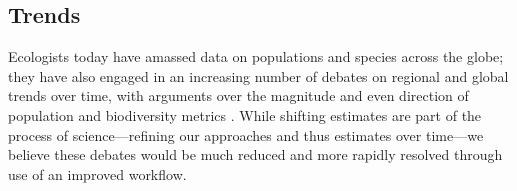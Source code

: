 \documentclass[11pt]{article}
\begin{document}
\subsection{Trends}


Ecologists today have amassed data on populations and species across the globe; they have also engaged in an increasing number of debates on regional and global trends over time, with arguments over the magnitude and even direction of population and biodiversity metrics \citep{Dornelas2014,Leung2020,terry2022no,muller2024weather}. While shifting estimates are part of the process of science---refining our approaches and thus estimates over time---we believe these debates would be much reduced and more rapidly resolved through use of an improved workflow. %
\end{document}
